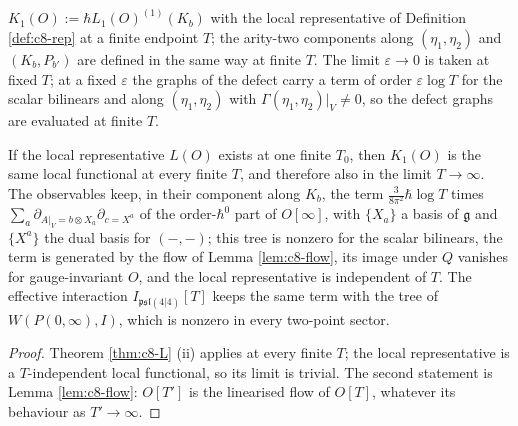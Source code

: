 \begin{definition}
\label{def:c8-K}
$K_1(O):=\hbar L_1(O)^{(1)}(K_b)$ with the local representative of Definition \ref{def:c8-rep} at a finite endpoint $T$; the arity-two components along $(\eta_1,\eta_2)$ and $(K_b,P_{b'})$ are defined in the same way at finite $T$. The limit $\varepsilon\to0$ is taken at fixed $T$; at a fixed $\varepsilon$ the graphs of the defect carry a term of order $\varepsilon\log T$ for the scalar bilinears and along $(\eta_1,\eta_2)$ with $\Gamma(\eta_1,\eta_2)|_V\neq0$, so the defect graphs are evaluated at finite $T$.
\end{definition}

\begin{theorem}
\label{thm:c8-K}
If the local representative $L(O)$ exists at one finite $T_0$, then $K_1(O)$ is the same local functional at every finite $T$, and therefore also in the limit $T\to\infty$. The observables keep, in their component along $K_b$, the term $\tfrac{3}{8\pi^2}\hbar\log T$ times $\sum_a\partial_{A|_V=b\otimes X_a}\partial_{c=X^a}$ of the order-$\hbar^0$ part of $O[\infty]$, with $\{X_a\}$ a basis of $\mathfrak g$ and $\{X^a\}$ the dual basis for $(-,-)$; this tree is nonzero for the scalar bilinears, the term is generated by the flow of Lemma \ref{lem:c8-flow}, its image under $Q$ vanishes for gauge-invariant $O$, and the local representative is independent of $T$. The effective interaction $I_{\mathfrak{psl}(4|4)}[T]$ keeps the same term with the tree of $W(P(0,\infty),I)$, which is nonzero in every two-point sector.
\end{theorem}

\begin{proof}
Theorem \ref{thm:c8-L} (ii) applies at every finite $T$; the local representative is a $T$-independent local functional, so its limit is trivial. The second statement is Lemma \ref{lem:c8-flow}: $O[T']$ is the linearised flow of $O[T]$, whatever its behaviour as $T'\to\infty$.
\end{proof}

